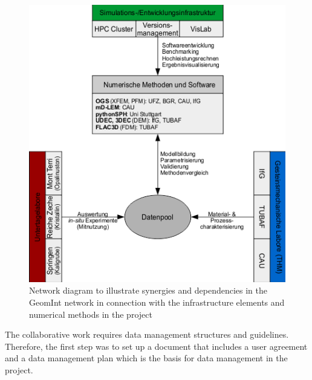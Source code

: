 \begin{figure}
\includegraphics[width=\textwidth]{figures/geomint-dms.png}
\caption{Network diagram to illustrate synergies and dependencies in the GeomInt network in connection with the infrastructure elements and numerical methods in the project}
\label{fig:geomint-dms}
\end{figure}

The collaborative work requires data management structures and guidelines. Therefore, the first step was to set up a document that includes a user agreement and a data management plan which is the basis for data management in the project.


